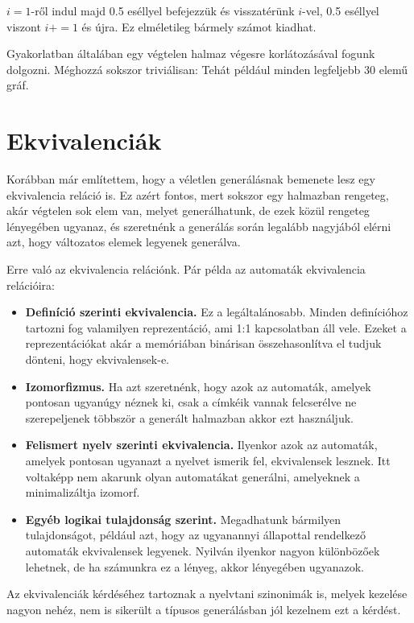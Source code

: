 \documentclass[12pt]{report}
\theoremstyle{definition}
\begin{document}
$i=1$-ről indul majd 0.5 eséllyel befejezzük és visszatérünk $i$-vel, 0.5 eséllyel viszont $i+=1$ és újra. Ez elméletileg bármely számot kiadhat.

Gyakorlatban általában egy végtelen halmaz végesre korlátozásával fogunk dolgozni. Méghozzá sokszor triviálisan: Tehát például minden legfeljebb 30 elemű gráf.

\section{Ekvivalenciák}
Korábban már említettem, hogy a véletlen generálásnak bemenete lesz egy ekvivalencia reláció is. Ez azért fontos, mert sokszor egy halmazban rengeteg, akár végtelen sok elem van, melyet generálhatunk, de ezek közül rengeteg lényegében ugyanaz, és szeretnénk a generálás során legalább nagyjából elérni azt, hogy változatos elemek legyenek generálva.

Erre való az ekvivalencia relációnk. Pár példa az automaták ekvivalencia relációira:

\begin{itemize}
\item \textbf{Definíció szerinti ekvivalencia.} Ez a legáltalánosabb. Minden definícióhoz tartozni fog valamilyen reprezentáció, ami 1:1 kapcsolatban áll vele. Ezeket a reprezentációkat akár a memóriában binárisan összehasonlítva el tudjuk dönteni, hogy ekvivalensek-e.
\item \textbf{Izomorfizmus.} Ha azt szeretnénk, hogy azok az automaták, amelyek pontosan ugyanúgy néznek ki, csak a címkéik vannak felcserélve ne szerepeljenek többször a generált halmazban akkor ezt használjuk.
\item \textbf{Felismert nyelv szerinti ekvivalencia.} Ilyenkor azok az automaták, amelyek pontosan ugyanazt a nyelvet ismerik fel, ekvivalensek lesznek. Itt voltaképp nem akarunk olyan automatákat generálni, amelyeknek a minimalizáltja izomorf.
\item \textbf{Egyéb logikai tulajdonság szerint.} Megadhatunk bármilyen tulajdonságot, például azt, hogy az ugyanannyi állapottal rendelkező automaták ekvivalensek legyenek. Nyilván ilyenkor nagyon különbözőek lehetnek, de ha számunkra ez a lényeg, akkor lényegében ugyanazok.
\end{itemize}

Az ekvivalenciák kérdéséhez tartoznak a nyelvtani szinonimák is, melyek kezelése nagyon nehéz, nem is sikerült a típusos generálásban jól kezelnem ezt a kérdést.
\end{document}

